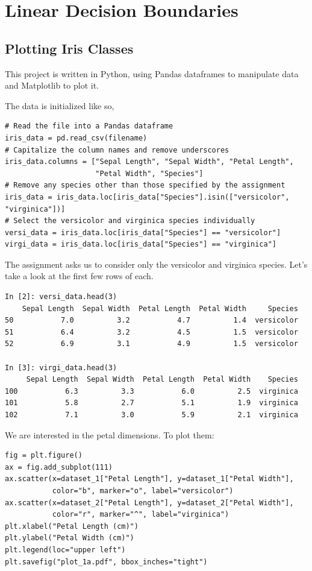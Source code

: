 \documentclass[letterpaper]{article}
\begin{document}
\section{Linear Decision Boundaries}

\subsection{Plotting Iris Classes}
This project is written in Python, using Pandas dataframes to manipulate data
and Matplotlib to plot it.

The data is initialized like so,
\begin{verbatim}
# Read the file into a Pandas dataframe
iris_data = pd.read_csv(filename)
# Capitalize the column names and remove underscores
iris_data.columns = ["Sepal Length", "Sepal Width", "Petal Length",
                     "Petal Width", "Species"]
# Remove any species other than those specified by the assignment
iris_data = iris_data.loc[iris_data["Species"].isin(["versicolor", "virginica"])]
# Select the versicolor and virginica species individually
versi_data = iris_data.loc[iris_data["Species"] == "versicolor"]
virgi_data = iris_data.loc[iris_data["Species"] == "virginica"]
\end{verbatim}
The assignment asks us to consider only the versicolor and virginica species.
Let's take a look at the first few rows of each.
\begin{verbatim}
In [2]: versi_data.head(3)
    Sepal Length  Sepal Width  Petal Length  Petal Width     Species
50           7.0          3.2           4.7          1.4  versicolor
51           6.4          3.2           4.5          1.5  versicolor
52           6.9          3.1           4.9          1.5  versicolor

In [3]: virgi_data.head(3)
     Sepal Length  Sepal Width  Petal Length  Petal Width    Species
100           6.3          3.3           6.0          2.5  virginica
101           5.8          2.7           5.1          1.9  virginica
102           7.1          3.0           5.9          2.1  virginica
\end{verbatim}
We are interested in the petal dimensions. To plot them:
\begin{verbatim}
fig = plt.figure()
ax = fig.add_subplot(111)
ax.scatter(x=dataset_1["Petal Length"], y=dataset_1["Petal Width"],
           color="b", marker="o", label="versicolor")
ax.scatter(x=dataset_2["Petal Length"], y=dataset_2["Petal Width"],
           color="r", marker="^", label="virginica")
plt.xlabel("Petal Length (cm)")
plt.ylabel("Petal Width (cm)")
plt.legend(loc="upper left")
plt.savefig("plot_1a.pdf", bbox_inches="tight")
\end{verbatim}
\end{document}
